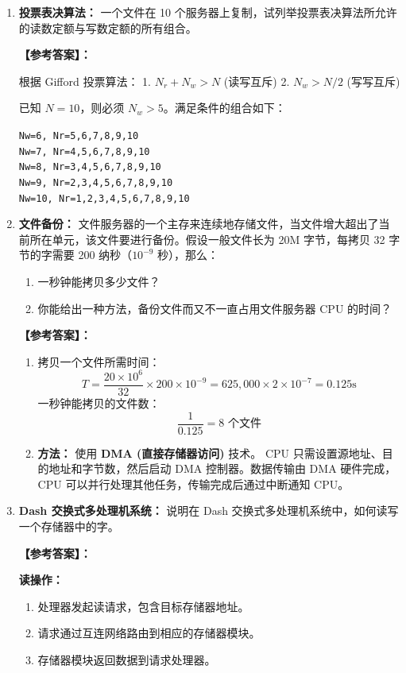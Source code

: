 \documentclass[a4paper,12pt]{article}
\newcommand{\answer}[1]{\par\vspace{0.5em}\hspace{2em}\textbf{【参考答案】：}\\{\color{blue}#1}\par\vspace{1em}}
\begin{document}
\begin{enumerate}[label=\arabic*.]
    \item \textbf{投票表决算法：}
    一个文件在 10 个服务器上复制，试列举投票表决算法所允许的读数定额与写数定额的所有组合。
    
    \answer{
    根据 Gifford 投票算法：
    1. $N_r + N_w > N$ (读写互斥)
    2. $N_w > N/2$ (写写互斥)
    
    已知 $N=10$，则必须 $N_w > 5$。满足条件的组合如下：
    
    \texttt{Nw=6,  Nr=5,6,7,8,9,10} \\
    \texttt{Nw=7,  Nr=4,5,6,7,8,9,10} \\
    \texttt{Nw=8,  Nr=3,4,5,6,7,8,9,10} \\
    \texttt{Nw=9,  Nr=2,3,4,5,6,7,8,9,10} \\
    \texttt{Nw=10, Nr=1,2,3,4,5,6,7,8,9,10}
    }

    \item \textbf{文件备份：}
    文件服务器的一个主存来连续地存储文件，当文件增大超出了当前所在单元，该文件要进行备份。假设一般文件长为 20M 字节，每拷贝 32 字节的字需要 200 纳秒（$10^{-9}$ 秒），那么：
    \begin{enumerate}[label=(\arabic*)]
        \item 一秒钟能拷贝多少文件？
        \item 你能给出一种方法，备份文件而又不一直占用文件服务器 CPU 的时间？
    \end{enumerate}
    
    \answer{
    \begin{enumerate}[label=(\arabic*)]
        \item 拷贝一个文件所需时间：
        \[ T = \frac{20 \times 10^6}{32} \times 200 \times 10^{-9} = 625,000 \times 2 \times 10^{-7} = 0.125 \text{s} \]
        一秒钟能拷贝的文件数：
        \[ \frac{1}{0.125} = 8 \text{ 个文件} \]
        
        \item \textbf{方法：} 使用 \textbf{DMA (直接存储器访问)} 技术。
        CPU 只需设置源地址、目的地址和字节数，然后启动 DMA 控制器。数据传输由 DMA 硬件完成，CPU 可以并行处理其他任务，传输完成后通过中断通知 CPU。
    \end{enumerate}
    }

    \item \textbf{Dash 交换式多处理机系统：}
    说明在 Dash 交换式多处理机系统中，如何读写一个存储器中的字。
    
    \answer{
    \textbf{读操作：}
    \begin{enumerate}[label=\arabic*.]
        \item 处理器发起读请求，包含目标存储器地址。
        \item 请求通过互连网络路由到相应的存储器模块。
        \item 存储器模块返回数据到请求处理器。
    \end{enumerate}
    
}
\end{enumerate}
\end{document}
